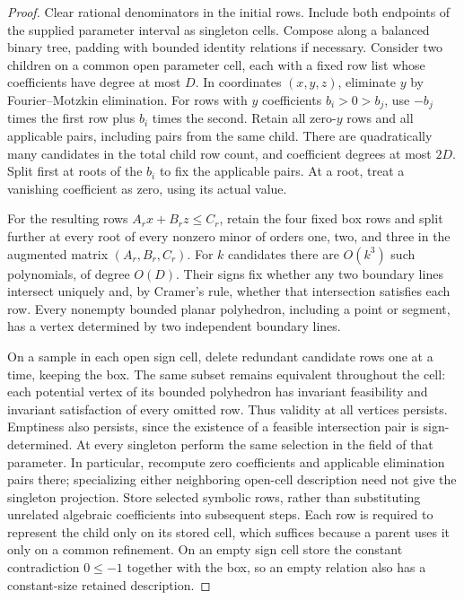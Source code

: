 \begin{proof}
Clear rational denominators in the initial rows. Include both endpoints
of the supplied parameter interval as singleton cells. Compose along a
balanced binary tree, padding with bounded identity relations if necessary.
Consider two children on a common open parameter cell, each with a fixed
row list whose coefficients have degree at most $D$. In coordinates
$(x,y,z)$, eliminate $y$ by Fourier--Motzkin elimination. For rows with
$y$ coefficients $b_i>0>b_j$, use $-b_j$ times the first row plus $b_i$
times the second. Retain all zero-$y$ rows and all applicable pairs,
including pairs from the same child. There are quadratically many
candidates in the total child row count, and coefficient degrees at most
$2D$. Split first at roots of the $b_i$ to fix the applicable pairs.
At a root, treat a vanishing coefficient as zero, using its actual value.

For the resulting rows $A_rx+B_rz\le C_r$, retain the four fixed box
rows and split further at every root of every nonzero minor of orders
one, two, and three in the augmented matrix $(A_r,B_r,C_r)$. For $k$
candidates there are $O(k^3)$ such polynomials, of degree $O(D)$.
Their signs fix whether any two boundary lines intersect uniquely and,
by Cramer's rule, whether that intersection satisfies each row. Every
nonempty bounded planar polyhedron, including a point or segment, has
a vertex determined by two independent boundary lines.

On a sample in each open sign cell, delete redundant candidate rows
one at a time, keeping the box. The same subset remains equivalent throughout the
cell: each potential vertex of its bounded polyhedron has invariant
feasibility and invariant satisfaction of every omitted row. Thus
validity at all vertices persists. Emptiness also persists, since the
existence of a feasible intersection pair is sign-determined. At every
singleton perform the same selection in the field of that parameter.
In particular, recompute zero coefficients and applicable elimination
pairs there; specializing either neighboring open-cell description
need not give the singleton projection. Store selected symbolic rows,
rather than substituting unrelated algebraic coefficients into subsequent
steps. Each row is required to represent the child only on its stored
cell, which suffices because a parent uses it only on a common refinement.
On an empty sign cell
store the constant contradiction $0\le-1$ together with the box,
so an empty relation also has a constant-size retained description.


\end{proof}

